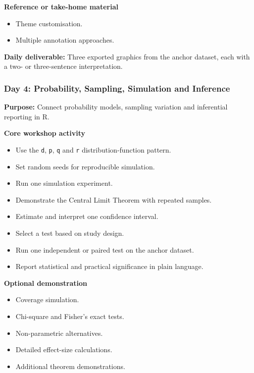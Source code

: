 \documentclass[11pt]{article}
\providecommand{\tightlist}{%
  \setlength{\itemsep}{0pt}\setlength{\parskip}{0pt}}
\begin{document}
\textbf{Reference or take-home material}

\begin{itemize}
\tightlist
\item
  Theme customisation.
\item
  Multiple annotation approaches.
\end{itemize}

\textbf{Daily deliverable:} Three exported graphics from the anchor
dataset, each with a two- or three-sentence interpretation.

\hypertarget{day-4-probability-sampling-simulation-and-inference}{%
\subsubsection{Day 4: Probability, Sampling, Simulation and
Inference}\label{day-4-probability-sampling-simulation-and-inference}}

\textbf{Purpose:} Connect probability models, sampling variation and
inferential reporting in R.

\textbf{Core workshop activity}

\begin{itemize}
\tightlist
\item
  Use the \texttt{d}, \texttt{p}, \texttt{q} and \texttt{r}
  distribution-function pattern.
\item
  Set random seeds for reproducible simulation.
\item
  Run one simulation experiment.
\item
  Demonstrate the Central Limit Theorem with repeated samples.
\item
  Estimate and interpret one confidence interval.
\item
  Select a test based on study design.
\item
  Run one independent or paired test on the anchor dataset.
\item
  Report statistical and practical significance in plain language.
\end{itemize}

\textbf{Optional demonstration}

\begin{itemize}
\tightlist
\item
  Coverage simulation.
\item
  Chi-square and Fisher's exact tests.
\item
  Non-parametric alternatives.
\item
  Detailed effect-size calculations.
\item
  Additional theorem demonstrations.
\end{itemize}
\end{document}
